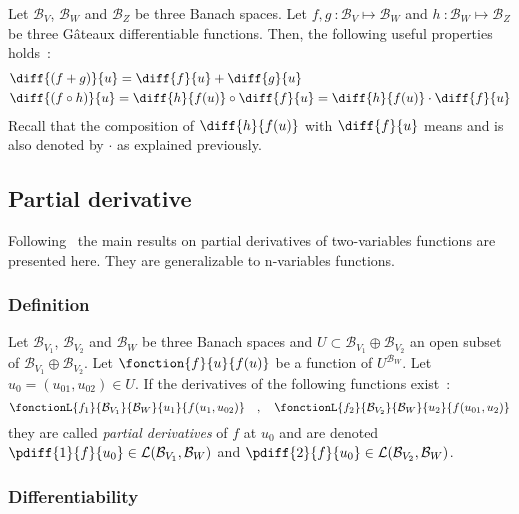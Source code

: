 Let $\mathcal{B}_V$, $\mathcal{B}_W$ and $\mathcal{B}_Z$ be three Banach spaces.
Let $f,g~: \mathcal{B}_V \longmapsto \mathcal{B}_W$ and $h~: \mathcal{B}_W \longmapsto \mathcal{B}_Z$ be three Gâteaux differentiable functions. Then, the following useful properties holds~:
\begin{align}
	&\diff{(f+g)}{u} = \diff{f}{u} + \diff{g}{u}\\
	&\diff{(f \circ h)}{u} = \diff{h}{f(u)}\circ\diff{f}{u} = \diff{h}{f(u)}\cdot\diff{f}{u}
\end{align}
Recall that the composition of $\diff{h}{f(u)}$ with $\diff{f}{u}$ means  and is also denoted by $\cdot$ as explained previously.

\subsection{Partial derivative}

Following~\cite{Abraham2002} the main results on partial derivatives of two-variables functions are presented here. They are generalizable to n-variables functions.

\subsubsection{Definition}

Let $\mathcal{B}_{V_1}$, $\mathcal{B}_{V_2}$ and $\mathcal{B}_W$ be three Banach spaces and $U \subset \mathcal{B}_{V_1}\oplus\mathcal{B}_{V_2}$ an open subset of $\mathcal{B}_{V_1}\oplus\mathcal{B}_{V_2}$.
Let $\fonction{f}{u}{f(u)}$ be a function of  $U^{\mathcal{B}_W}$.
Let $u_0 = (u_{01},u_{02}) \in U$.
If the derivatives of the following functions exist~:
\begin{equation}
	\fonctionL{f_1}{\mathcal{B}_{V_1}}{\mathcal{B}_{W}}{u_1}{f(u_1,u_{02})}
	\quad , \quad
	\fonctionL{f_2}{\mathcal{B}_{V_2}}{\mathcal{B}_{W}}{u_2}{f(u_{01},u_{2})}
\end{equation}
they are called \emph{partial derivatives} of $f$ at $u_0$ and are denoted $\pdiff{1}{f}{u_0} \in
\mathcal{L}(\mathcal{B}_{V_1},{\mathcal{B}_W})$ and $\pdiff{2}{f}{u_0} \in
\mathcal{L}(\mathcal{B}_{V_2},{\mathcal{B}_W})$.

\subsubsection{Differentiability}

